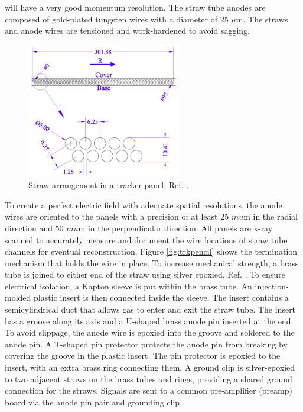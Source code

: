will have a very good momentum resolution. The straw tube anodes are composed of gold-plated tungsten wires 
with a diameter of 25 $\mu$m. The straws and anode wires are tensioned and work-hardened to avoid sagging.
\begin{figure}[!h]
    \centering
    \includegraphics[width =0.6\textwidth]{figures/png/Screenshot_20240326_234405.png}
    \caption{Straw arrangement in a tracker panel, Ref. \cite{trk}.}
    \label{fig:trktubes}
    \end{figure}
To create a perfect electric field with adequate spatial resolutions, the anode wires are oriented 
to the panels with a precision of at least 25 $mu$m in the radial direction and 50 $mu$m in the 
perpendicular direction. All panels are x-ray scanned to accurately measure and document the wire 
locations of straw tube channels for eventual reconstruction. Figure \ref{fig:trkpencil} shows the 
termination mechanism that holds the wire in place.
To increase mechanical strength, a brass tube is joined to either end of the straw using silver epoxied, Ref. \cite{bartoszek2015mu2e}. 
To ensure electrical isolation, a Kapton sleeve is put within the brass tube. An injection-molded plastic insert is then connected 
inside the sleeve. The insert contains a semicylindrical duct that allows gas to enter and exit the straw tube. The insert 
has a groove along its axis and a U-shaped brass anode pin inserted at the end. To avoid slippage, the anode wire is 
epoxied into the groove and soldered to the anode pin.
A T-shaped pin protector protects the anode pin from breaking by covering the groove in the plastic insert. 
The pin protector is epoxied to the insert, with an extra brass ring connecting them. A ground clip 
is silver-epoxied to two adjacent straws on the brass tubes and rings, providing a shared ground connection 
for the straws. 
Signals are sent to a common pre-amplifier (preamp) board via the anode pin pair and grounding clip. 
